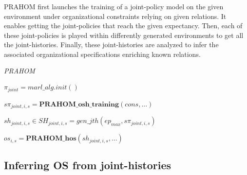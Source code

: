 \documentclass[doubleblind]{ecai}
\newcounter{relation}
\begin{document}
PRAHOM first launches the training of a joint-policy model on the given environment under organizational constraints relying on given relations. It enables getting the joint-policies that reach the given expectancy. Then, each of these joint-policies is played within differently generated environments to get all the joint-histories. Finally, these joint-histories are analyzed to infer the associated organizational specifications enriching known relations.


\begin{algorithm}[hbt!]
    \caption{\emph{PRAHOM}}\label{alg:PRAHOM}




    $\pi_{joint} = marl\_alg.init()$


    $s\pi_{joint,i,s} = \mathbf{PRAHOM\_osh\_training}(cons,\dots)$


    $sh_{joint,i,s} \in SH_{joint,i,s} = gen\_jth(ep_{max}, s\pi_{joint,i,s})$

    $os_{i,s} = \mathbf{PRAHOM\_hos}(sh_{joint,i,s},\dots)$

\end{algorithm}


\subsection{\textbf{Inferring OS from joint-histories}}
\end{document}
